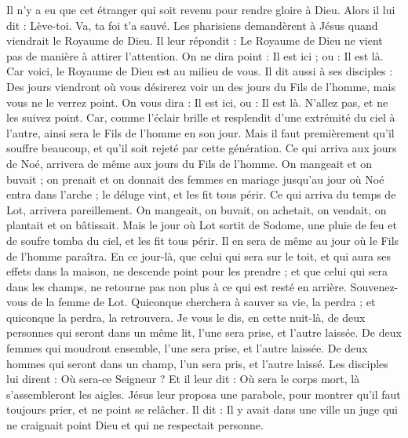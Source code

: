 \begin{multicols}{2}
Il n'y a eu que cet étranger qui soit revenu pour rendre gloire à Dieu.
Alors il lui dit : Lève-toi. Va, ta foi t'a sauvé.
Les pharisiens demandèrent à Jésus quand viendrait le Royaume de Dieu. Il leur répondit : Le Royaume de Dieu ne vient pas de manière à attirer l'attention.
On ne dira point : Il est ici ; ou : Il est là. Car voici, le Royaume de Dieu est au milieu de vous.
Il dit aussi à ses disciples : Des jours viendront où vous désirerez voir un des jours du Fils de l'homme, mais vous ne le verrez point. On vous dira :
Il est ici, ou : Il est là. N'allez pas, et ne les suivez point.
Car, comme l'éclair brille et resplendit d'une extrémité du ciel à l'autre, ainsi sera le Fils de l'homme en son jour.
Mais il faut premièrement qu'il souffre beaucoup, et qu'il soit rejeté par cette génération.
Ce qui arriva aux jours de Noé, arrivera de même aux jours du Fils de l'homme.
On mangeait et on buvait ; on prenait et on donnait des femmes en mariage jusqu'au jour où Noé entra dans l'arche ; le déluge vint, et les fit tous périr.
Ce qui arriva du temps de Lot, arrivera pareillement. On mangeait, on buvait, on achetait, on vendait, on plantait et on bâtissait.
Mais le jour où Lot sortit de Sodome, une pluie de feu et de soufre tomba du ciel, et les fit tous périr.
Il en sera de même au jour où le Fils de l'homme paraîtra.
En ce jour-là, que celui qui sera sur le toit, et qui aura ses effets dans la maison, ne descende point pour les prendre ; et que celui qui sera dans les champs, ne retourne pas non plus à ce qui est resté en arrière.
Souvenez-vous de la femme de Lot.
Quiconque cherchera à sauver sa vie, la perdra ; et quiconque la perdra, la retrouvera.
Je vous le dis, en cette nuit-là, de deux personnes qui seront dans un même lit, l'une sera prise, et l'autre laissée.
De deux femmes qui moudront ensemble, l'une sera prise, et l'autre laissée.
De deux hommes qui seront dans un champ, l'un sera pris, et l'autre laissé.
Les disciples lui dirent : Où sera-ce Seigneur ? Et il leur dit : Où sera le corps mort, là s'assembleront les aigles.
\VerseOne{}Jésus leur proposa une parabole, pour montrer qu'il faut toujours prier, et ne point se relâcher.
Il dit : Il y avait dans une ville un juge qui ne craignait point Dieu et qui ne respectait personne.

\end{multicols}
